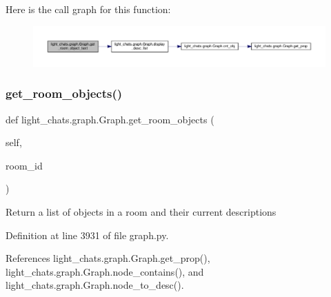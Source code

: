 Here is the call graph for this function\+:
\nopagebreak
\begin{figure}[H]
\begin{center}
\leavevmode
\includegraphics[width=350pt]{classlight__chats_1_1graph_1_1Graph_a4d24052d36cff3896424e2e3bce2d554_cgraph}
\end{center}
\end{figure}
\mbox{\label{classlight__chats_1_1graph_1_1Graph_ad078aab1d28474ac43e8b58ba0fb586b}} 
\subsubsection{\texorpdfstring{get\+\_\+room\+\_\+objects()}{get\_room\_objects()}}
{\footnotesize\ttfamily def light\+\_\+chats.\+graph.\+Graph.\+get\+\_\+room\+\_\+objects (\begin{DoxyParamCaption}\item[{}]{self,  }\item[{}]{room\+\_\+id }\end{DoxyParamCaption})}

\begin{DoxyVerb}Return a list of objects in a room and their current descriptions\end{DoxyVerb}
 

Definition at line 3931 of file graph.\+py.



References light\+\_\+chats.\+graph.\+Graph.\+get\+\_\+prop(), light\+\_\+chats.\+graph.\+Graph.\+node\+\_\+contains(), and light\+\_\+chats.\+graph.\+Graph.\+node\+\_\+to\+\_\+desc().

